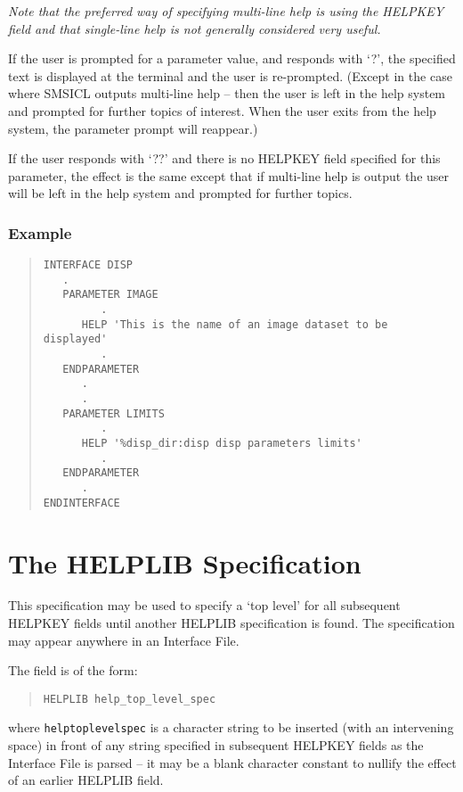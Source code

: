 \documentclass[twoside,11pt]{article}
\newcommand{\xlabel}[1]{}
\renewcommand{\_}{\texttt{\symbol{95}}}
\begin{document}
{\em Note that the preferred way of specifying multi-line help
is using the HELPKEY field and that single-line help is not generally
considered very useful.}

If the user is prompted for a parameter value, and responds with `?',
the specified text is displayed at the terminal and the user is re-prompted.
(Except in the case where SMSICL outputs multi-line help -- then the user
is left in the help system and prompted for further topics of interest.
When the user exits from the help system, the parameter prompt will
reappear.)

If the user responds with `??' and there is no HELPKEY
field specified for this parameter, the effect is the same except that
if multi-line help is output the user will
be left in the help system and prompted for further topics.

\subsubsection*{Example}
\begin{quote} \begin{verbatim}
INTERFACE DISP
   .
   PARAMETER IMAGE
         .
      HELP 'This is the name of an image dataset to be displayed'
         .
   ENDPARAMETER
      .
      .
   PARAMETER LIMITS
         .
      HELP '%disp_dir:disp disp parameters limits'
         .
   ENDPARAMETER
      .
ENDINTERFACE
\end{verbatim} \end{quote}

\section{The HELPLIB Specification\xlabel{the_helplib_specification}
\label{helplib}}

This specification may be used to specify a `top level' for all subsequent
HELPKEY fields until another HELPLIB specification is found. The specification
may appear anywhere in an Interface File.

The field is of the form:
\begin{quote} \begin{verbatim}
HELPLIB help_top_level_spec
\end{verbatim} \end{quote}
where \texttt{help\_top\_level\_spec} is a character string to be inserted (with an
intervening space) in front of any string specified in subsequent HELPKEY
fields as the Interface File is parsed --
it may be a blank character constant to nullify the
effect of an earlier HELPLIB field.
\end{document}

